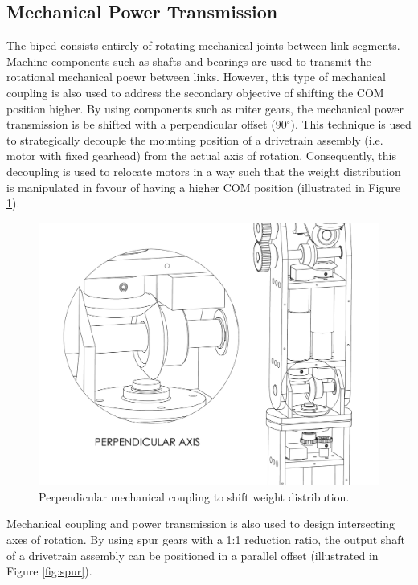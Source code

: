 \subsection{Mechanical Power Transmission} %
\label{sub:mechanical_power_transmission}
The biped consists entirely of rotating mechanical joints between link segments. Machine components such as shafts and bearings are used to transmit the rotational mechanical poewr between links. However, this type of mechanical coupling is also used to address the secondary objective of shifting the COM position higher. By using components such as miter gears, the mechanical power transmission is be shifted with a perpendicular offset (90$^\circ$). This technique is used to strategically decouple the mounting position of a drivetrain assembly (i.e. motor with fixed gearhead) from the actual axis of rotation. Consequently, this decoupling is used to relocate motors in a way such that the weight distribution is manipulated in favour of having a higher COM position (illustrated in Figure \ref{fig:miter}).
	
\begin{figure}[!h]
	\begin{center}
    \includegraphics[scale=0.5]{fig/design/perpendicular.pdf}
	\end{center}
  \caption{Perpendicular mechanical coupling to shift weight distribution.}
\label{fig:miter}
\end{figure}

Mechanical coupling and power transmission is also used to design  intersecting axes of rotation. By using spur gears with a 1:1 reduction ratio, the output shaft of a drivetrain assembly can be positioned in a parallel offset (illustrated in Figure \ref{fig:spur}).


